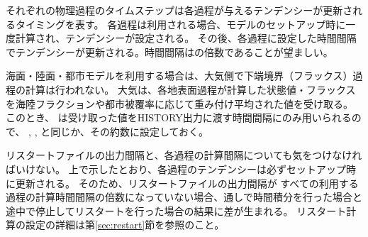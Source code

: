 それぞれの物理過程のタイムステップは各過程が与えるテンデンシーが更新されるタイミングを表す。
各過程は利用される場合、モデルのセットアップ時に一度計算され、テンデンシーが設定される。
その後、各過程に設定した時間間隔でテンデンシーが更新される。時間間隔はの倍数であることが望ましい。


海面・陸面・都市モデルを利用する場合は、大気側で下端境界（フラックス）過程の計算は行われない。
大気は、各地表面過程が計算した状態値・フラックスを海陸フラクションや都市被覆率に応じて重み付け平均された値を受け取る。
このとき、 は受け取った値をHISTORY出力に渡す時間間隔にのみ用いられるので、
, ,  と同じか、その約数に設定しておく。

リスタートファイルの出力間隔と、各過程の計算間隔についても気をつけなければいけない。
上で示したとおり、各過程のテンデンシーは必ずセットアップ時に更新される。
そのため、リスタートファイルの出力間隔が
すべての利用する過程の計算時間間隔の倍数になっていない場合、通しで時間積分を行った場合と
途中で停止してリスタートを行った場合の結果に差が生まれる。
リスタート計算の設定の詳細は第\ref{sec:restart}節を参照のこと。

